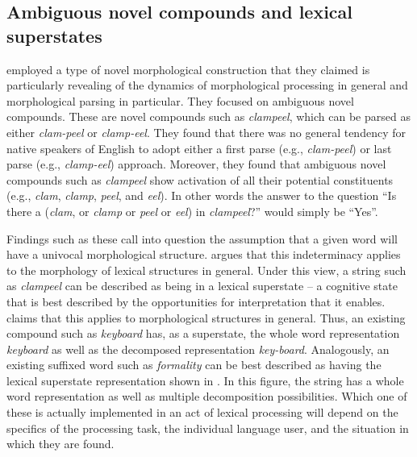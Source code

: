 \documentclass[output=paper]{langsci/langscibook}
\begin{document}
\subsection{Ambiguous novel compounds and lexical superstates}\label{sec:libben:1.3}

\citet{LibbenDerwingdeAlmeida1999} employed a type of novel morphological construction that they claimed is particularly revealing of the dynamics of morphological processing in general and morphological parsing in particular.  They focused on ambiguous novel compounds. These are novel compounds such as \textit{clampeel}, which can be parsed as either \textit{clam-peel} or \textit{clamp-eel}.  They found that there was no general tendency for native speakers of English to adopt either a first parse (e.g., \textit{clam-peel}) or last parse (e.g., \textit{clamp-eel}) approach. Moreover, they found that ambiguous novel compounds such as \textit{clampeel} show activation of all their potential constituents (e.g., \textit{clam}, \textit{clamp}, \textit{peel}, and \textit{eel}). In other words the answer to the question “Is there a (\textit{clam}, or \textit{clamp} or \textit{peel} or \textit{eel}) in \textit{clampeel}?” would simply be “Yes”.

Findings such as these call into question the assumption that a given word will have a univocal morphological structure.  \citet{Libbeninpress} argues that this indeterminacy applies to the morphology of lexical structures in general.  Under this view, a string such as \textit{clampeel} can be described as being in a lexical superstate – a cognitive state that is best described by the opportunities for interpretation that it enables.  \citet{Libbeninpress} claims that this applies to morphological structures in general. Thus, an existing compound such as \textit{keyboard} has, as a superstate, the whole word representation \textit{keyboard} as well as the decomposed representation \textit{key-board}. Analogously, an existing suffixed word such as \textit{formality} can be best described as having the lexical superstate representation shown in . In this figure, the string has a whole word representation as well as multiple decomposition possibilities. Which one of these is actually implemented in an act of lexical processing will depend on the specifics of the processing task, the individual language user, and the situation in which they are found.
\end{document}

